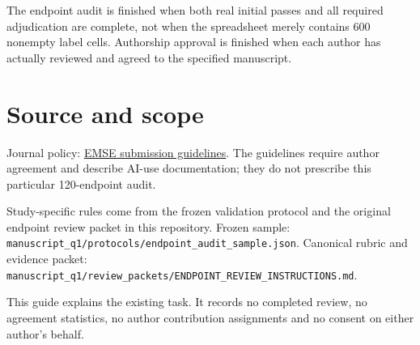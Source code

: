 \documentclass[11pt,a4paper]{article}
\begin{document}
The endpoint audit is finished when both real initial passes and all required adjudication are complete, not when the spreadsheet merely contains 600 nonempty label cells. Authorship approval is finished when each author has actually reviewed and agreed to the specified manuscript.


\section{Source and scope}


Journal policy: \href{https://link.springer.com/journal/10664/submission-guidelines}{EMSE submission guidelines}. The guidelines require author agreement and describe AI-use documentation; they do not prescribe this particular 120-endpoint audit.


Study-specific rules come from the frozen validation protocol and the original endpoint review packet in this repository. Frozen sample: \nolinkurl{manuscript_q1/protocols/endpoint_audit_sample.json}. Canonical rubric and evidence packet: \nolinkurl{manuscript_q1/review_packets/ENDPOINT_REVIEW_INSTRUCTIONS.md}.


This guide explains the existing task. It records no completed review, no agreement statistics, no author contribution assignments and no consent on either author's behalf.
\end{document}
